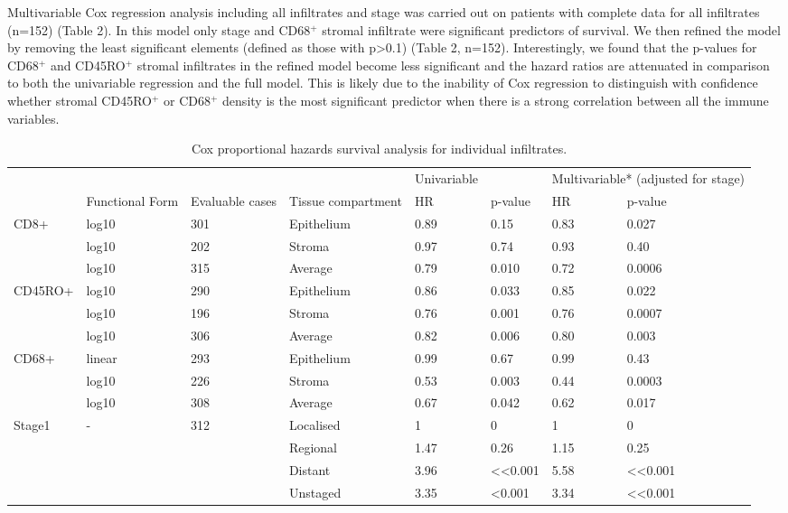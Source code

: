 Multivariable Cox regression analysis including all infiltrates and stage was carried out on patients with complete data for all infiltrates (n=152) (Table 2).  In this model only stage and CD68$^+$ stromal infiltrate were significant predictors of survival. 
We then refined the model by removing the least significant elements (defined as those with p>0.1) (Table 2, n=152). Interestingly, we found that the p-values for CD68$^+$ and CD45RO$^+$ stromal infiltrates in the refined model become less significant and the hazard ratios are attenuated in comparison to both the univariable regression and the full model. This is likely due to the inability of Cox regression to distinguish with confidence whether stromal CD45RO$^+$ or CD68$^+$ density is the most significant predictor when there is a strong correlation between all the immune variables.
\begin{landscape}
\begin{table}[]
    \centering
    \begin{tabular}{llllllll}
    
		& & &&		Univariable && \multicolumn{2}{c}{	Multivariable* 
(adjusted for stage)} \\
								
&	Functional Form &	Evaluable cases&	Tissue compartment&	HR &	p-value	& HR &	p-value	\\ \hline
CD8+ &	log10 &	301	&Epithelium&	0.89&	0.15&	0.83&	0.027\\	
&	log10&	202&	Stroma&	0.97&	0.74&	0.93&	0.40\\	
&	log10&	315&	Average&	0.79&	0.010&	0.72&	0.0006\\	
CD45RO+&	log10&	290&	Epithelium&	0.86&	0.033&	0.85&	0.022\\	
	&log10&	196&	Stroma&	0.76&	0.001&	0.76&	0.0007\\	
	&log10&	306&	Average&	0.82&	0.006&	0.80&	0.003\\	
CD68+&	linear&	293&	Epithelium&	0.99&	0.67&	0.99&	0.43\\	
&	log10&	226	&Stroma	&0.53&	0.003&	0.44&	0.0003	\\
&	log10&	308	&Average&	0.67&	0.042&	0.62&	0.017\\	
Stage1 & - &	312&	Localised&	1&	0&	1&	0	\\
	& & &		Regional&	1.47&	0.26&	1.15&	0.25\\	
	&	&&	Distant	&3.96&	<<0.001&	5.58&	<<0.001	\\
	&	&&	Unstaged&	3.35&	<0.001&	3.34&	<<0.001	\\ \hline

\end{tabular}
    \caption[Individual immune infiltrates Cox regression]{Cox proportional hazards survival analysis for individual infiltrates.}
    \label{tab:coxsurv}
\end{table}
\end{landscape}

